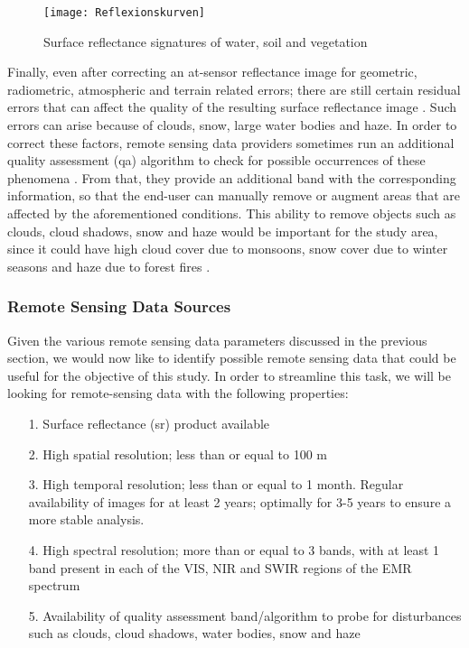 \begin{figure}[H]
	\centering
	\texttt{[image: Reflexionskurven]}
	\caption{Surface reflectance signatures of water, soil and vegetation \citep{SM2005}}\label{Fig7}
\end{figure}
\vspace{-12pt}

\justify
Finally, even after correcting an at-sensor reflectance image for geometric, radiometric, atmospheric and terrain related errors; there are still certain residual errors that can affect the quality of the resulting surface reflectance image \citep{landsat2009, lwin2008, landsat2016}. Such errors can arise because of clouds, snow, large water bodies and haze. In order to correct these factors, remote sensing data providers sometimes run an additional quality assessment (\ac{qa}) algorithm to check for possible occurrences of these phenomena \citep{landsat2016}. From that, they provide an additional band with the corresponding information, so that the end-user can manually remove or augment areas that are affected by the aforementioned conditions. This ability to remove objects such as clouds, cloud shadows, snow and haze would be important for the study area, since it could have high cloud cover due to monsoons, snow cover due to winter seasons and haze due to forest fires \citep{Kumar2015, landsat2009}.

\vfill

\subsubsection{Remote Sensing Data Sources}

Given the various remote sensing data parameters discussed in the previous section, we would now like to identify possible remote sensing data that could be useful for the objective of this study. In order to streamline this task, we will be looking for remote-sensing data with the following properties:

\begin{itemize}
	\item [1. ] Surface reflectance (\ac{sr}) product available
	\item [2. ] High spatial resolution; less than or equal to 100 m
	\item [3. ] High temporal resolution; less than or equal to 1 month. Regular availability of images for at least 2 years; optimally for 3-5 years to ensure a more stable analysis.
	\item [4. ] High spectral resolution; more than or equal to 3 bands, with at least 1 band present in each of the VIS, NIR and SWIR regions of the EMR spectrum
	\item [5. ] Availability of quality assessment band/algorithm to probe for disturbances such as clouds, cloud shadows, water bodies, snow and haze
\end{itemize}

